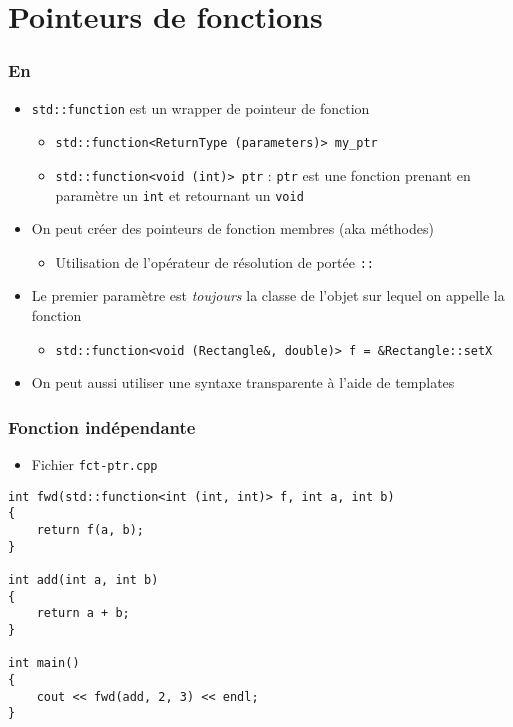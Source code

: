 \section{Pointeurs de fonctions}

\begin{frame}
\frametitle{En \cpp}
\begin{itemize}[<+->]
\item \texttt{std::function} est un wrapper de pointeur de fonction
	\begin{itemize}
	\item \texttt{std::function<ReturnType (parameters)> my\_ptr}
	\item \lstinline|std::function<void (int)> ptr| : \texttt{ptr} est une fonction prenant en paramètre un \lstinline|int| et retournant un \lstinline|void|
	\end{itemize}
\item On peut créer des pointeurs de fonction membres (aka méthodes)
	\begin{itemize}
	\item Utilisation de l'opérateur de résolution de portée \texttt{::}
	\end{itemize}
\item Le premier paramètre est \emph{toujours} la classe de l'objet sur lequel on appelle la fonction
	\begin{itemize}
	\item \tiny{\lstinline|std::function<void (Rectangle&, double)> f = &Rectangle::setX|}
	\end{itemize}
\item On peut aussi utiliser une syntaxe transparente à l'aide de templates
\end{itemize}
\end{frame}

\begin{frame}[containsverbatim]
\frametitle{Fonction indépendante}
\begin{itemize}
\item Fichier \texttt{fct-ptr.cpp}
\end{itemize}
\begin{lstlisting}
int fwd(std::function<int (int, int)> f, int a, int b)
{
	return f(a, b);
}

int add(int a, int b)
{
	return a + b;
}

int main()
{
	cout << fwd(add, 2, 3) << endl;
}
\end{lstlisting}
\end{frame}


